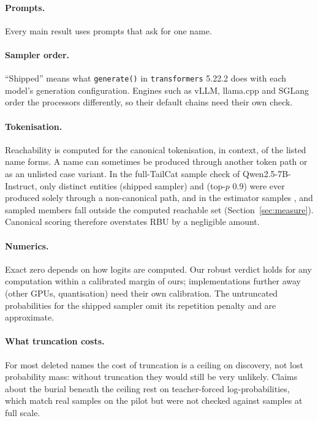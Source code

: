 \documentclass[11pt]{article}
\begin{document}
\paragraph{Prompts.} Every main result uses prompts that ask for one name. \pdListPrompt{}

\paragraph{Sampler order.} ``Shipped'' means what \texttt{generate()} in \texttt{transformers} 5.22.2 does with each model's generation configuration. Engines such as vLLM, llama.cpp and SGLang order the processors differently, so their default chains need their own check.

\paragraph{Tokenisation.} Reachability is computed for the canonical tokenisation, in context, of the listed name forms. A name can sometimes be produced through another token path or as an unlisted case variant. In the full-TailCat sample check of Qwen2.5-7B-Instruct, only \ptNoncanonEntShipped{} distinct entities (shipped sampler) and \ptNoncanonEntPnine{} (top-$p$ 0.9) were ever produced solely through a non-canonical path, and in the estimator samples \peQwenShippedOutside{}, \peQwenPnineOutside{} and \peOlmoPnineOutside{} sampled members fall outside the computed reachable set (Section~\ref{sec:measure}). Canonical scoring therefore overstates RBU by a negligible amount.

\paragraph{Numerics.} Exact zero depends on how logits are computed. Our robust verdict holds for any computation within a calibrated margin of ours; implementations further away (other GPUs, quantisation) need their own calibration. The untruncated probabilities for the shipped sampler omit its repetition penalty and are approximate.

\paragraph{What truncation costs.} For most deleted names the cost of truncation is a ceiling on discovery, not lost probability mass: without truncation they would still be very unlikely. Claims about the burial beneath the ceiling rest on teacher-forced log-probabilities, which match real samples on the pilot but were not checked against samples at full scale.
\end{document}

